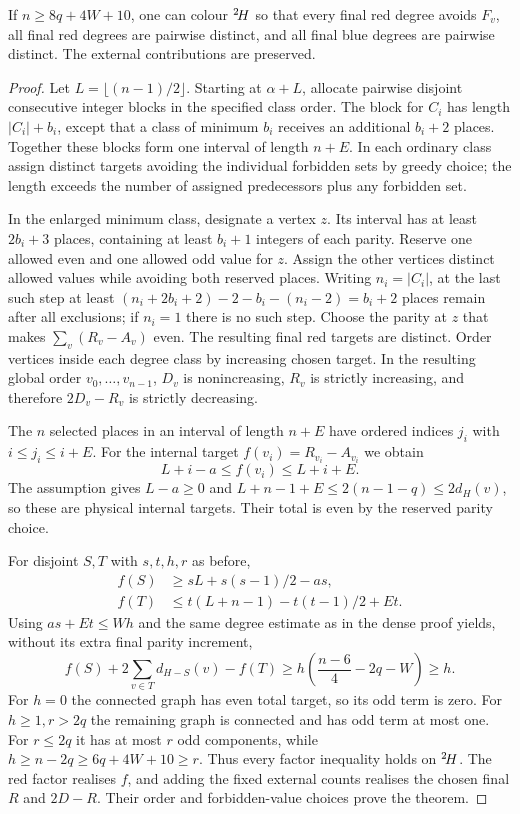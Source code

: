 \begin{theorem}\label{thm:denselists}
If $n\ge8q+4W+10$, one can colour ${}^{2}\!H$ so that every final
red degree avoids $F_v$, all final red degrees are pairwise distinct,
and all final blue degrees are pairwise distinct. The external
contributions are preserved.
\end{theorem}
\begin{proof}
Let $L=\lfloor(n-1)/2\rfloor$. Starting at $\alpha+L$, allocate
pairwise disjoint consecutive integer blocks in the specified class
order. The block for $C_i$ has length $|C_i|+b_i$, except that a
class of minimum $b_i$ receives an additional $b_i+2$ places.
Together these blocks form one interval of length $n+E$.
In each ordinary class assign distinct targets avoiding the
individual forbidden sets by greedy choice; the length exceeds the
number of assigned predecessors plus any forbidden set.

In the enlarged minimum class, designate a vertex $z$. Its interval
has at least $2b_i+3$ places, containing at least $b_i+1$ integers
of each parity. Reserve one allowed even and one allowed odd value
for $z$. Assign the other vertices distinct allowed values while
avoiding both reserved places. Writing $n_i=|C_i|$, at the last
such step at least
$(n_i+2b_i+2)-2-b_i-(n_i-2)=b_i+2$ places remain after all
exclusions; if $n_i=1$ there is no such step. Choose the parity at $z$ that makes
$\sum_v(R_v-A_v)$ even. The resulting final red targets are distinct.
Order vertices inside each degree class by increasing chosen target.
In the resulting global order $v_0,\ldots,v_{n-1}$, $D_v$ is
nonincreasing, $R_v$ is strictly increasing, and therefore
$2D_v-R_v$ is strictly decreasing.

The $n$ selected places in an interval of length $n+E$ have ordered
indices $j_i$ with $i\le j_i\le i+E$. For the internal target
$f(v_i)=R_{v_i}-A_{v_i}$ we obtain
\begin{equation}\label{eq:densetargetband}
 L+i-a\le f(v_i)\le L+i+E.
\end{equation}
The assumption gives $L-a\ge0$ and
$L+n-1+E\le2(n-1-q)\le2d_H(v)$, so these are physical internal
targets. Their total is even by the reserved parity choice.

For disjoint $S,T$ with $s,t,h,r$ as before,
\begin{align*}
 f(S)&\ge sL+s(s-1)/2-as,\\
 f(T)&\le t(L+n-1)-t(t-1)/2+Et.
\end{align*}
Using $as+Et\le Wh$ and the same degree estimate as in the dense
proof yields, without its extra final parity increment,
\[
 f(S)+2\sum_{v\in T}d_{H-S}(v)-f(T)
 \ge h\left(\frac{n-6}{4}-2q-W\right)\ge h.
\]
For $h=0$ the connected graph has even total target, so its odd term
is zero. For $h\ge1,r>2q$ the remaining graph is connected and has
odd term at most one. For $r\le2q$ it has at most $r$ odd
components, while $h\ge n-2q\ge6q+4W+10\ge r$.
Thus every factor inequality holds on ${}^{2}\!H$. The red factor
realises $f$, and adding the fixed external counts realises the
chosen final $R$ and $2D-R$. Their order and forbidden-value choices
prove the theorem.
\end{proof}

